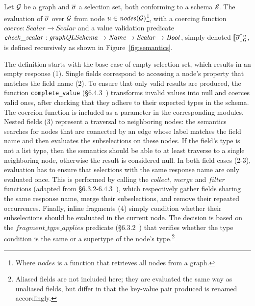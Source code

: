 
\begin{definition}
Let $\mathcal{G}$ be a graph and $\overline{\sigma}$ a selection set, both conforming to a schema $\mathcal{S}$. The evaluation of $\overline{\sigma}$ over $\mathcal{G}$ from node $u \in \mathit{nodes}(\mathcal{G})$\footnote{Where $\mathit{nodes}$ is a function that retrieves all nodes from a graph.}, with a coercing function $\mathit{coerce} : \mathit{Scalar} \to \mathit{Scalar}$ and a value validation predicate $\mathit{check\_scalar} : \mathit{graphQLSchema} \to \mathit{Name} \to \mathit{Scalar} \to \mathit{Bool}$, simply denoted $\llbracket \overline{\sigma} \rrbracket^{u}_{\mathcal{G}}$, is defined recursively as shown in Figure~\ref{fig:semantics}. 
\end{definition}

The definition starts with the base case of empty selection set, which results in an empty response (1). 
Single fields correspond to accessing a node's property that matches the field name (2). 
To ensure that only valid results are produced, the function \texttt{complete\_value} (\cf\S6.4.3~\cite{gqlspec}) transforms invalid values into null and coerces valid ones, after checking that they adhere to their expected types in the schema.
The coercion function is included as a parameter in the corresponding modules.
Nested fields (3) represent a traversal to neighboring nodes: the semantics searches for nodes that are connected by an edge whose label matches the field name and then evaluates the subselections on these nodes. If the field's type is not a list type, then the semantics should be able to at least traverse to a single neighboring node, otherwise the result is considered null. 
In both field cases (2-3), evaluation has to ensure that selections with the same response name are only evaluated once. 
This is performed by calling the $\mathit{collect}$, $\mathit{merge}$ and $\mathit{filter}$ functions (adapted from \S6.3.2-6.4.3~\cite{gqlspec}), which respectively gather fields sharing the same response name, merge their subselections, and remove their repeated occurrences. Finally, inline fragments (4) simply condition whether their subselections should be evaluated in the current node. The decision is based on the $\mathit{fragment\_type\_applies}$ predicate (\cf\S6.3.2~\cite{gqlspec}) that verifies whether the type condition is the same or a supertype of the node's type.\footnote{Aliased fields are not included here; they are evaluated the same way as unaliased fields, but differ in that the key-value pair produced is renamed accordingly.}

